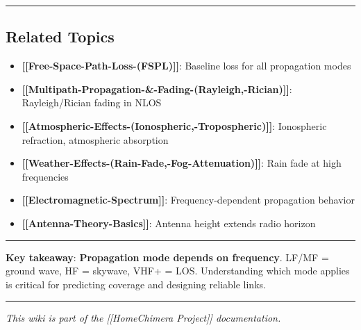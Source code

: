 \begin{center}\rule{0.5\linewidth}{0.5pt}\end{center}

\subsection{Related Topics}\label{related-topics}

\begin{itemize}
\tightlist
\item
  \textbf{{[}{[}Free-Space-Path-Loss-(FSPL){]}{]}}: Baseline loss for
  all propagation modes
\item
  \textbf{{[}{[}Multipath-Propagation-\&-Fading-(Rayleigh,-Rician){]}{]}}:
  Rayleigh/Rician fading in NLOS
\item
  \textbf{{[}{[}Atmospheric-Effects-(Ionospheric,-Tropospheric){]}{]}}:
  Ionospheric refraction, atmospheric absorption
\item
  \textbf{{[}{[}Weather-Effects-(Rain-Fade,-Fog-Attenuation){]}{]}}:
  Rain fade at high frequencies
\item
  \textbf{{[}{[}Electromagnetic-Spectrum{]}{]}}: Frequency-dependent
  propagation behavior
\item
  \textbf{{[}{[}Antenna-Theory-Basics{]}{]}}: Antenna height extends
  radio horizon
\end{itemize}

\begin{center}\rule{0.5\linewidth}{0.5pt}\end{center}

\textbf{Key takeaway}: \textbf{Propagation mode depends on frequency}.
LF/MF = ground wave, HF = skywave, VHF+ = LOS. Understanding which mode
applies is critical for predicting coverage and designing reliable
links.

\begin{center}\rule{0.5\linewidth}{0.5pt}\end{center}

\emph{This wiki is part of the {[}{[}Home\textbar Chimera Project{]}{]}
documentation.}
